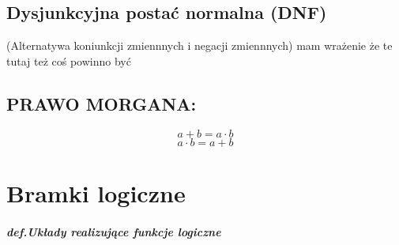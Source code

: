 \documentclass{article}
\begin{document}
\subsection{Dysjunkcyjna postać normalna (DNF)}
(Alternatywa koniunkcji zmiennnych i negacji zmiennnych)
mam wrażenie że te tutaj też coś powinno być

\subsection{PRAWO MORGANA:}
\[a + b = a \cdot b\]
\[a \cdot b = a + b\]

\section{Bramki logiczne}
	\subparagraph{\textit{def.}Układy realizujące funkcje logiczne}
\end{document}
